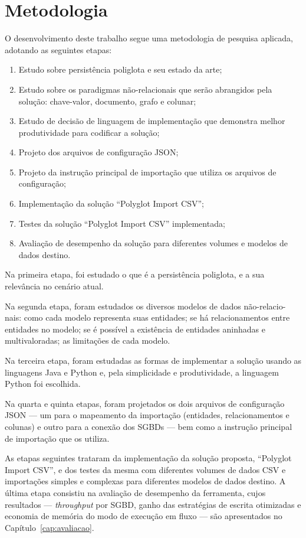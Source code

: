\section{Metodologia}

O desenvolvimento deste trabalho segue uma metodologia de pesquisa aplicada, adotando as
seguintes etapas:

\begin{enumerate}
  \item Estudo sobre persistência poliglota e seu estado da arte;
  \item Estudo sobre os paradigmas não-relacionais que serão abrangidos pela solução:
        chave-valor, documento, grafo e colunar;
  \item Estudo de decisão de linguagem de implementação que demonstra melhor produtividade
        para codificar a solução;
  \item Projeto dos arquivos de configuração JSON;
  \item Projeto da instrução principal de importação que utiliza os arquivos de
        configuração;
  \item Implementação da solução ``Polyglot Import CSV'';
  \item Testes da solução ``Polyglot Import CSV'' implementada;
  \item Avaliação de desempenho da solução para diferentes volumes e modelos de dados
        destino.
\end{enumerate}

Na primeira etapa, foi estudado o que é a persistência poliglota, e a sua relevância no
cenário atual.

Na segunda etapa, foram estudados os diversos modelos de dados não-relacio-
nais: como cada
modelo representa suas entidades; se há relacionamentos entre entidades no modelo; se é
possível a existência de entidades aninhadas e multivaloradas; as limitações de cada
modelo.

Na terceira etapa, foram estudadas as formas de implementar a solução usando as linguagens
Java e Python e, pela simplicidade e produtividade, a linguagem Python foi escolhida.

Na quarta e quinta etapas, foram projetados os dois arquivos de configuração JSON --- um
para o mapeamento da importação (entidades, relacionamentos e colunas) e outro para a
conexão dos SGBDs --- bem como a instrução principal de importação que os utiliza.

As etapas seguintes trataram da implementação da solução proposta, ``Polyglot Import
CSV'', e dos testes da mesma com diferentes volumes de dados CSV e importações simples e
complexas para diferentes modelos de dados destino. A última etapa consistiu na avaliação
de desempenho da ferramenta, cujos resultados --- \textit{throughput} por SGBD, ganho das
estratégias de escrita otimizadas e economia de memória do modo de execução em fluxo ---
são apresentados no Capítulo~\ref{cap:avaliacao}.

